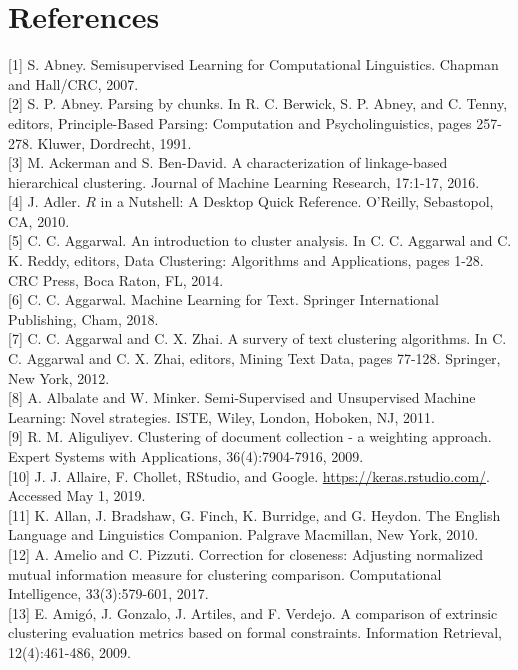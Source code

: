 \documentclass[10pt]{book}
\begin{document}
\section*{References}
[1] S. Abney. Semisupervised Learning for Computational Linguistics. Chapman and Hall/CRC, 2007.\\[0pt]
[2] S. P. Abney. Parsing by chunks. In R. C. Berwick, S. P. Abney, and C. Tenny, editors, Principle-Based Parsing: Computation and Psycholinguistics, pages 257-278. Kluwer, Dordrecht, 1991.\\[0pt]
[3] M. Ackerman and S. Ben-David. A characterization of linkage-based hierarchical clustering. Journal of Machine Learning Research, 17:1-17, 2016.\\[0pt]
[4] J. Adler. $R$ in a Nutshell: A Desktop Quick Reference. O'Reilly, Sebastopol, CA, 2010.\\[0pt]
[5] C. C. Aggarwal. An introduction to cluster analysis. In C. C. Aggarwal and C. K. Reddy, editors, Data Clustering: Algorithms and Applications, pages 1-28. CRC Press, Boca Raton, FL, 2014.\\[0pt]
[6] C. C. Aggarwal. Machine Learning for Text. Springer International Publishing, Cham, 2018.\\[0pt]
[7] C. C. Aggarwal and C. X. Zhai. A survery of text clustering algorithms. In C. C. Aggarwal and C. X. Zhai, editors, Mining Text Data, pages 77-128. Springer, New York, 2012.\\[0pt]
[8] A. Albalate and W. Minker. Semi-Supervised and Unsupervised Machine Learning: Novel strategies. ISTE, Wiley, London, Hoboken, NJ, 2011.\\[0pt]
[9] R. M. Aliguliyev. Clustering of document collection - a weighting approach. Expert Systems with Applications, 36(4):7904-7916, 2009.\\[0pt]
[10] J. J. Allaire, F. Chollet, RStudio, and Google. \href{https://keras.rstudio.com/}{https://keras.rstudio.com/}. Accessed May 1, 2019.\\[0pt]
[11] K. Allan, J. Bradshaw, G. Finch, K. Burridge, and G. Heydon. The English Language and Linguistics Companion. Palgrave Macmillan, New York, 2010.\\[0pt]
[12] A. Amelio and C. Pizzuti. Correction for closeness: Adjusting normalized mutual information measure for clustering comparison. Computational Intelligence, 33(3):579-601, 2017.\\[0pt]
[13] E. Amigó, J. Gonzalo, J. Artiles, and F. Verdejo. A comparison of extrinsic clustering evaluation metrics based on formal constraints. Information Retrieval, 12(4):461-486, 2009.\\[0pt]
\end{document}
